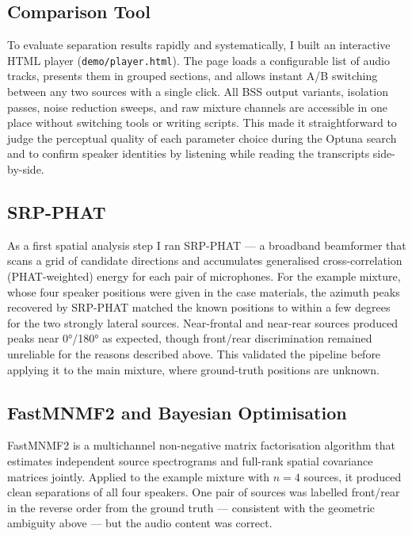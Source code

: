 
\subsection{Comparison Tool}

To evaluate separation results rapidly and systematically, I built an interactive HTML player (\texttt{demo/player.html}). The page loads a configurable list of audio tracks, presents them in grouped sections, and allows instant A/B switching between any two sources with a single click. All BSS output variants, isolation passes, noise reduction sweeps, and raw mixture channels are accessible in one place without switching tools or writing scripts. This made it straightforward to judge the perceptual quality of each parameter choice during the Optuna search and to confirm speaker identities by listening while reading the transcripts side-by-side.


\subsection{SRP-PHAT}

As a first spatial analysis step I ran SRP-PHAT — a broadband beamformer that scans a grid of candidate directions and accumulates generalised cross-correlation (PHAT-weighted) energy for each pair of microphones. For the example mixture, whose four speaker positions were given in the case materials, the azimuth peaks recovered by SRP-PHAT matched the known positions to within a few degrees for the two strongly lateral sources. Near-frontal and near-rear sources produced peaks near 0°/180° as expected, though front/rear discrimination remained unreliable for the reasons described above. This validated the pipeline before applying it to the main mixture, where ground-truth positions are unknown.

\subsection{FastMNMF2 and Bayesian Optimisation}

FastMNMF2 \cite{} is a multichannel non-negative matrix factorisation algorithm that estimates independent source spectrograms and full-rank spatial covariance matrices jointly. Applied to the example mixture with $n{=}4$ sources, it produced clean separations of all four speakers. One pair of sources was labelled front/rear in the reverse order from the ground truth — consistent with the geometric ambiguity above — but the audio content was correct.

